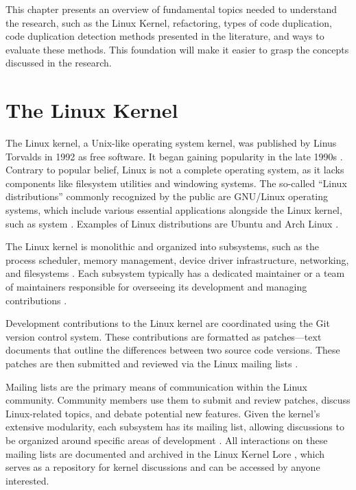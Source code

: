 \en

This chapter presents an overview of fundamental topics needed to understand 
the research, such as the Linux Kernel, refactoring, types of code duplication, 
code duplication detection methods presented in the literature, and ways to 
evaluate these methods. This foundation will make it easier to grasp the 
concepts discussed in the research.

\section{The Linux Kernel}

The Linux kernel, a Unix-like operating system kernel, was published by Linus
Torvalds in 1992 as free software. It began gaining popularity in the late
1990s \citep{linuxbook}. Contrary to popular belief, Linux is not a
complete operating system, as it lacks components like filesystem utilities and
windowing systems. The so-called ``Linux distributions'' commonly
recognized by the public are GNU/Linux operating systems, which
include various essential applications alongside the Linux kernel,
such as system
\citep{gnuref}. Examples of Linux distributions are Ubuntu \citep{ubuntu} 
and Arch Linux \citep{archlinux}.

The Linux kernel is monolithic and organized into subsystems, such as
the process scheduler, memory management, device driver infrastructure,
networking, and filesystems \citep{melissa}. Each subsystem typically has a
dedicated maintainer or a team of maintainers responsible for overseeing its
development and managing contributions \citep{melissa}.

Development contributions to the Linux kernel are coordinated using the Git
version control system. These contributions are formatted as patches—text
documents that outline the differences between two source code versions.
These patches are then submitted and reviewed via the Linux mailing lists
\citep{melissa}.

Mailing lists are the primary means of communication within the Linux
community. Community members use them to submit and review patches,
discuss Linux-related topics, and debate potential new features. Given the
kernel's extensive modularity, each subsystem has its mailing list, allowing
discussions to be organized around specific areas of development
\citep{melissa}. All interactions on these mailing lists are documented and
archived in the Linux Kernel Lore \citep{linuxlore}, which serves as a
repository for kernel discussions and can be accessed by anyone interested.

